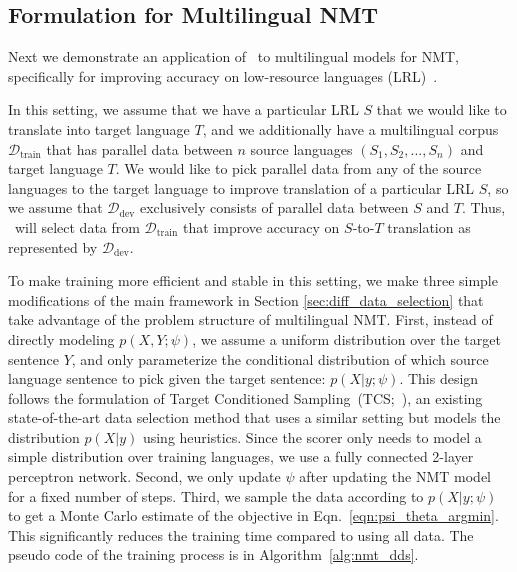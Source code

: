 \subsection{\label{sec:nmt_method}Formulation for Multilingual NMT}

Next we demonstrate an application of \dds~to multilingual models for NMT, specifically for improving accuracy on low-resource languages (LRL)~\citep{nmt_transfer,rapid_adapt_nmt}.

In this setting, we assume that we have a particular LRL $S$ that we would like to translate into target language $T$, and we additionally have a multilingual corpus $\mathcal{D}_{\text{train}}$ that has parallel data between $n$ source languages $(S_1, S_2, ..., S_n)$ and target language $T$. We would like to pick parallel data from any of the source languages to the target language to improve translation of a particular LRL $S$, so we assume that $\mathcal{D}_{\text{dev}}$ exclusively consists of parallel data between $S$ and $T$.
Thus, \dds~will select data from $\mathcal{D}_{\text{train}}$ that improve accuracy on $S$-to-$T$ translation as represented by $\mathcal{D}_{\text{dev}}$.

To make training more efficient and stable in this setting, we make three simple modifications of the main framework in Section \ref{sec:diff_data_selection} that take advantage of the problem structure of multilingual NMT.
First, instead of directly modeling $p(X,Y;\psi)$, we assume a uniform distribution over the target sentence $Y$, %
and only parameterize the conditional distribution of which source language sentence to pick given the target sentence: $p(X|y;\psi)$. This design follows the formulation of Target Conditioned Sampling~(TCS;~\citet{TCS}), an existing state-of-the-art data selection method that uses a similar setting but models the distribution $p(X|y)$ using heuristics.  Since the scorer only needs to model a simple distribution over training languages, we use a fully connected 2-layer perceptron network.
Second, we only update $\psi$ after updating the NMT model for a fixed number of steps.
Third, we sample the data according to $p(X|y;\psi)$ to get a Monte Carlo estimate of the objective in Eqn.~\ref{eqn:psi_theta_argmin}.
This significantly reduces the training time compared to using all data.
The pseudo code of the training process is in Algorithm~\ref{alg:nmt_dds}.

